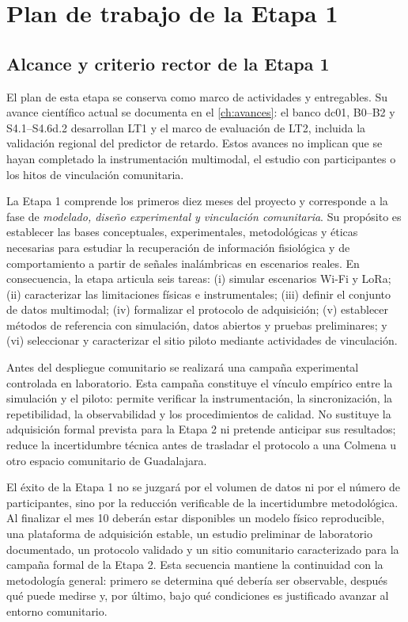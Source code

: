 \chapter{Plan de trabajo de la Etapa 1}
\label{ch:wbs_stage1}

\section{Alcance y criterio rector de la Etapa 1}

El plan de esta etapa se conserva como marco de actividades y entregables. Su avance científico actual se documenta en el \cref{ch:avances}: el banco dc01, B0--B2 y S4.1--S4.6d.2 desarrollan LT1 y el marco de evaluación de LT2, incluida la validación regional del predictor de retardo. Estos avances no implican que se hayan completado la instrumentación multimodal, el estudio con participantes o los hitos de vinculación comunitaria.

La Etapa 1 comprende los primeros diez meses del proyecto y corresponde a la fase de
\emph{modelado, diseño experimental y vinculación comunitaria}. Su propósito es
establecer las bases conceptuales, experimentales, metodológicas y éticas necesarias para
estudiar la recuperación de información fisiológica y de comportamiento a partir de
señales inalámbricas en escenarios reales. En consecuencia, la etapa articula seis tareas:
(i) simular escenarios Wi-Fi y LoRa; (ii) caracterizar las limitaciones físicas e
instrumentales; (iii) definir el conjunto de datos multimodal; (iv) formalizar el protocolo
de adquisición; (v) establecer métodos de referencia con simulación, datos abiertos y
pruebas preliminares; y (vi) seleccionar y caracterizar el sitio piloto mediante actividades
de vinculación.

Antes del despliegue comunitario se realizará una campaña experimental controlada en
laboratorio. Esta campaña constituye el vínculo empírico entre la simulación y el piloto:
permite verificar la instrumentación, la sincronización, la repetibilidad, la observabilidad
y los procedimientos de calidad. No sustituye la adquisición formal prevista para la
Etapa 2 ni pretende anticipar sus resultados; reduce la incertidumbre técnica antes de
trasladar el protocolo a una Colmena u otro espacio comunitario de Guadalajara.

El éxito de la Etapa 1 no se juzgará por el volumen de datos ni por el número de
participantes, sino por la reducción verificable de la incertidumbre metodológica. Al
finalizar el mes 10 deberán estar disponibles un modelo físico reproducible, una plataforma
de adquisición estable, un estudio preliminar de laboratorio documentado, un protocolo
validado y un sitio comunitario caracterizado para la campaña formal de la Etapa 2. Esta
secuencia mantiene la continuidad con la metodología general: primero se determina qué
debería ser observable, después qué puede medirse y, por último, bajo qué condiciones es
justificado avanzar al entorno comunitario.

